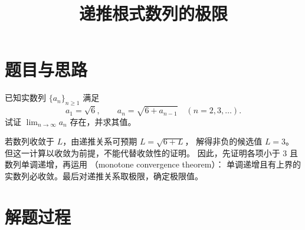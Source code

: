\documentclass{ctexart}
\title{递推根式数列的极限}
\author{}
\date{}
\begin{document}
\maketitle

\section{题目与思路}

\begin{example}[原题 1.5.1]
已知实数列 $\{a_n\}_{n\ge1}$ 满足
\begin{equation}\label{eq:radical-recurrence}
  a_1=\sqrt{6},\qquad
  a_n=\sqrt{6+a_{n-1}}\quad(n=2,3,\ldots).
\end{equation}
试证 $\displaystyle\lim_{n\to\infty}a_n$ 存在，并求其值。
\end{example}

\begin{analyze}
若数列收敛于 $L$，由递推关系可预期 $L=\sqrt{6+L}$，
解得非负的候选值 $L=3$。但这一计算以收敛为前提，不能代替收敛性的证明。
因此，先证明各项小于 $3$ 且数列单调递增，再运用
（monotone convergence theorem）：
单调递增且有上界的实数列必收敛。最后对递推关系取极限，确定极限值。
\end{analyze}

\section{解题过程}
\end{document}

